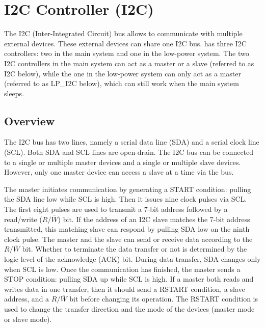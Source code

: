 \documentclass[main\_\_EN.tex]{subfiles}
\begin{document}

\ifglobal
\else
    {\let\clearpage\relax \listoftodos}
    {\let\clearpage\relax \listofdonetodos}
    \tableofcontents
\fi











\hypertarget{i2c}{}
\chapter{I2C Controller (I2C)}
\label{mod:i2c}


The I2C (Inter-Integrated Circuit) bus allows \chipname{} to communicate with multiple external devices. These external devices can share one I2C bus.
\chipname{} has three I2C controllers: two in the main system and one in the low-power system. The two I2C controllers in the main system can act as a master or a slave (referred to as I2C below), while the one in the low-power system can only act as a master (referred to as LP\_I2C below), which can still work when the main system sleeps.


\section{Overview}
The I2C bus has two lines, namely a serial data line (SDA) and a serial clock line (SCL). Both SDA and SCL lines are open-drain. The I2C bus can be connected to a single or multiple master devices and a single or multiple slave devices. However, only one master device can access a slave at a time via the bus.

The master initiates communication by generating a START condition: pulling the SDA line low while SCL is high. Then it issues nine clock pulses via SCL. The first eight pulses are used to transmit a 7-bit address followed by a read/write ($R/\overline W$) bit. If the address of an I2C slave matches the 7-bit address transmitted, this matching slave can respond by pulling SDA low on the ninth clock pulse. The master and the slave can send or receive data according to the $R/\overline W$ bit. Whether to terminate the data transfer or not is determined by the logic level of the acknowledge (ACK) bit. During data transfer, SDA changes only when SCL is low. Once the communication has finished, the master sends a STOP condition: pulling SDA up while SCL is high. If a master both reads and writes data in one transfer, then it should send a RSTART condition, a slave address, and a $R/\overline W$ bit before changing its operation. The RSTART condition is used to change the transfer direction and the mode of the devices (master mode or slave mode).
\end{document}
